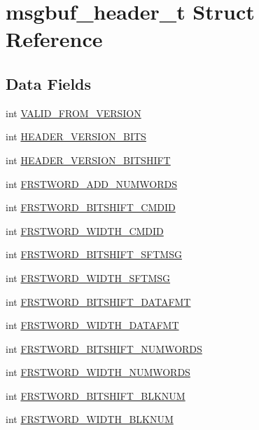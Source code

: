 \hypertarget{structmsgbuf__header__t}{
\section{msgbuf\_\-header\_\-t Struct Reference}
\label{structmsgbuf__header__t}
}
\subsection*{Data Fields}
\begin{CompactItemize}
\item 
int \hyperlink{structmsgbuf__header__t_2d7dc0360571deed5bb400535dd09318}{VALID\_\-FROM\_\-VERSION}
\item 
int \hyperlink{structmsgbuf__header__t_d576520bf5242643edb45474d294086b}{HEADER\_\-VERSION\_\-BITS}
\item 
int \hyperlink{structmsgbuf__header__t_0c67137e91ca9be67684094c75331f23}{HEADER\_\-VERSION\_\-BITSHIFT}
\item 
int \hyperlink{structmsgbuf__header__t_c96868f83c9b95da536f668edbb3f9db}{FRSTWORD\_\-ADD\_\-NUMWORDS}
\item 
int \hyperlink{structmsgbuf__header__t_5613d893ab652401624518811769c7f8}{FRSTWORD\_\-BITSHIFT\_\-CMDID}
\item 
int \hyperlink{structmsgbuf__header__t_10a75f96f061399a714ed5e4b37c1439}{FRSTWORD\_\-WIDTH\_\-CMDID}
\item 
int \hyperlink{structmsgbuf__header__t_8b168b71e1c62e52b43ddce2a1b777dc}{FRSTWORD\_\-BITSHIFT\_\-SFTMSG}
\item 
int \hyperlink{structmsgbuf__header__t_87b758b56e97db8198bd7d6405bdb874}{FRSTWORD\_\-WIDTH\_\-SFTMSG}
\item 
int \hyperlink{structmsgbuf__header__t_aa00d1cdea9a4385ded4fd62af6c3bd1}{FRSTWORD\_\-BITSHIFT\_\-DATAFMT}
\item 
int \hyperlink{structmsgbuf__header__t_e78c1f0a8758ef8d18056b01f664b720}{FRSTWORD\_\-WIDTH\_\-DATAFMT}
\item 
int \hyperlink{structmsgbuf__header__t_219d3f943829db1d50613a7f2629818d}{FRSTWORD\_\-BITSHIFT\_\-NUMWORDS}
\item 
int \hyperlink{structmsgbuf__header__t_45844eb2528f63b7dbd58f5947794d4b}{FRSTWORD\_\-WIDTH\_\-NUMWORDS}
\item 
int \hyperlink{structmsgbuf__header__t_51f61e787244c9002fba785687789bdb}{FRSTWORD\_\-BITSHIFT\_\-BLKNUM}
\item 
int \hyperlink{structmsgbuf__header__t_5a5421dab3b5eab22b180a8971bc9c2f}{FRSTWORD\_\-WIDTH\_\-BLKNUM}

\end{CompactItemize}
